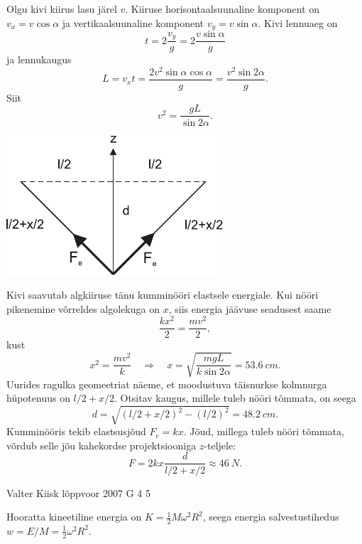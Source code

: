 \documentclass[11pt]{article}
\begin{document}
{{\ifSolution
Olgu kivi kiirus lasu järel $v$. Kiiruse horisontaalsuunaline komponent on $v_x = v \cos \alpha$ ja vertikaalsuunaline komponent $v_y = v \sin \alpha$. Kivi lennuaeg on
\[
t = 2 \frac{v_y}{g} = 2 \frac{v\sin\alpha}{g}
\]
ja lennukaugus
\[
L=v_{x} t=\frac{2 v^{2} \sin \alpha \cos \alpha}{g}=\frac{v^{2} \sin 2 \alpha}{g}.
\]
Siit
\[
v^2 = \frac{gL}{\sin 2\alpha}.
\]

\begin{center}
	\includegraphics[width=0.5\linewidth]{2006-v3g-03-lah}
\end{center}

Kivi saavutab algkiiruse tänu kumminööri elastsele energiale. Kui nööri pikenemine võrreldes algolekuga on $x$, siis energia jäävuse seadusest saame
\[
\frac{k x^{2}}{2}=\frac{m v^{2}}{2},
\]
kust
\[
x^{2}=\frac{m v^{2}}{k} \quad\Rightarrow\quad x=\sqrt{\frac{m g L}{k \sin 2 \alpha}}=\SI{53,6}{cm}.
\]
Uurides ragulka geomeetriat näeme, et moodustuva täisnurkse kolmnurga hüpotenuus on $l/2+x/2$. Otsitav kaugus, millele tuleb nööri tõmmata, on seega
\[
d=\sqrt{(l / 2+x / 2)^{2}-(l / 2)^{2}}=\SI{48.2}{cm}.
\]
Kumminööris tekib elastsusjõud $F_e = kx$. Jõud, millega tuleb nööri tõmmata, võrdub selle jõu kahekordse projektsiooniga $z$-teljele:
\[
F=2 k x \frac{d}{l / 2+x/2} \approx \SI{46}{N}.
\]
\fi
}

{Valter Kiisk} %
{lõppvoor} %
{2007} %
{G 4} %
{5} %
{

\ifSolution
\osa Hooratta kineetiline energia on $K = \frac{1}{2}M\omega^2R^2$, seega energia salvestustihedus $w = E/M = \frac{1}{2} \omega^2R^2$.

}}
\end{document}
